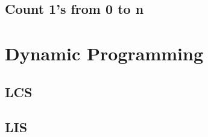 \documentclass[10pt, a4paper]{article}
\begin{document}
\begin{multicols}{2}
\subsection{Count 1's from 0 to n}


\section{Dynamic Programming}
\subsection{LCS}


\subsection{LIS}


\end{multicols}
\end{document}
